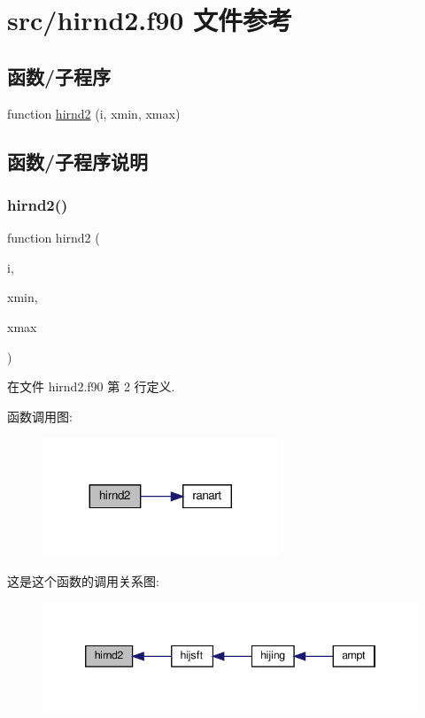 \hypertarget{hirnd2_8f90}{}\section{src/hirnd2.f90 文件参考}
\label{hirnd2_8f90}
\subsection*{函数/子程序}
\begin{DoxyCompactItemize}
\item 
function \mbox{\hyperlink{hirnd2_8f90_a5de9c38852645ec8544eefd13ffb3de5}{hirnd2}} (i, xmin, xmax)
\end{DoxyCompactItemize}


\subsection{函数/子程序说明}
\mbox{\label{hirnd2_8f90_a5de9c38852645ec8544eefd13ffb3de5}} 
\subsubsection{\texorpdfstring{hirnd2()}{hirnd2()}}
{\footnotesize\ttfamily function hirnd2 (\begin{DoxyParamCaption}\item[{}]{i,  }\item[{}]{xmin,  }\item[{}]{xmax }\end{DoxyParamCaption})}



在文件 hirnd2.\+f90 第 2 行定义.

函数调用图\+:
\nopagebreak
\begin{figure}[H]
\begin{center}
\leavevmode
\includegraphics[width=200pt]{hirnd2_8f90_a5de9c38852645ec8544eefd13ffb3de5_cgraph}
\end{center}
\end{figure}
这是这个函数的调用关系图\+:
\nopagebreak
\begin{figure}[H]
\begin{center}
\leavevmode
\includegraphics[width=346pt]{hirnd2_8f90_a5de9c38852645ec8544eefd13ffb3de5_icgraph}
\end{center}
\end{figure}

